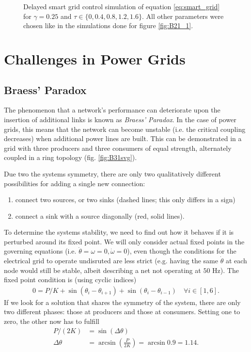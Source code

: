 \documentclass{scrartcl}
\begin{document}
\begin{figure}[h]
    \centering
    \caption{Delayed smart grid control simulation of equation
        \eqref{eq:smart_grid} for $\gamma = 0.25$ and $\tau\in \{0, 0.4,
        0.8, 1.2, 1.6\}$. All other parameters were chosen like in the
        simulations done for figure \ref{fig:B21_1}.}
    \label{fig:B23}
\end{figure}

\clearpage

\section{Challenges in Power Grids}
\subsection{Braess' Paradox}
The phenomenon that a network's performance can deteriorate upon the insertion of additional links is known as \emph{Braess' Paradox}. 
In the case of power grids, this means that the network can become unstable (i.e. the critical coupling decreases) when additional power lines are built. 
This can be demonstrated in a grid with three producers and three consumers of equal strength, alternately coupled in a ring topology (fig. \ref{fig:B31svg}). 

Due two the systems symmetry, there are only two qualitatively different possibilities for adding a single new connection:
\begin{enumerate}
 \item connect two sources, or two sinks (dashed lines; this only differs in a sign)
 \item connect a sink with a source diagonally (red, solid lines).
\end{enumerate}

To determine the systems stability, we need to find out how it behaves if
it is perturbed around its fixed point. We will only consider actual fixed
points in the governing equations (i.e. $\dot{\theta} = \omega = 0,
\dot{\omega} = 0$), even though the conditions for the electrical grid to
operate undisruted are less strict (e.g. having the same $\dot{\theta}$ at
each node would still be stable, albeit describing a net not operating at
$50$ Hz).
The fixed point condition is (using cyclic indices)
\begin{align}
 0 = P/K + \sin \left(\theta_i - \theta_{i+1} \right) + \sin \left(\theta_i - \theta_{i-1} \right) \quad \forall i \in \left[ 1, 6\right].
\end{align}
If we look for a solution that shares the symmetry of the system, there are
only two different phases: those at producers and those at consumers.
Setting one to zero, the other now has to fulfill
\begin{align}
P/(2K) &= \sin \left( \Delta \theta \right)\\
\Delta \theta &= \arcsin \left( \frac{P}{2K}\right) = \arcsin{0.9} = 1.14.
\end{align}
 
\end{document}
